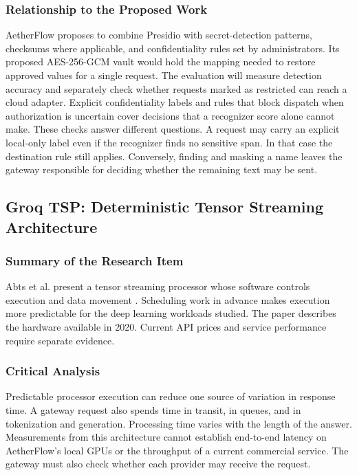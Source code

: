 \documentclass{FastFyp}
\begin{document}
\subsubsection{Relationship to the Proposed Work}
AetherFlow proposes to combine Presidio with secret-detection patterns, checksums where applicable, and confidentiality rules set by administrators. Its proposed AES-256-GCM vault would hold the mapping needed to restore approved values for a single request. The evaluation will measure detection accuracy and separately check whether requests marked as restricted can reach a cloud adapter. Explicit confidentiality labels and rules that block dispatch when authorization is uncertain cover decisions that a recognizer score alone cannot make. These checks answer different questions. A request may carry an explicit local-only label even if the recognizer finds no sensitive span. In that case the destination rule still applies. Conversely, finding and masking a name leaves the gateway responsible for deciding whether the remaining text may be sent.

\subsection{Groq TSP: Deterministic Tensor Streaming Architecture}
\subsubsection{Summary of the Research Item}
Abts et al. present a tensor streaming processor whose software controls execution and data movement \cite{ref:GroqTSP}. Scheduling work in advance makes execution more predictable for the deep learning workloads studied. The paper describes the hardware available in 2020. Current API prices and service performance require separate evidence.

\subsubsection{Critical Analysis}
Predictable processor execution can reduce one source of variation in response time. A gateway request also spends time in transit, in queues, and in tokenization and generation. Processing time varies with the length of the answer. Measurements from this architecture cannot establish end-to-end latency on AetherFlow's local GPUs or the throughput of a current commercial service. The gateway must also check whether each provider may receive the request.
\end{document}
